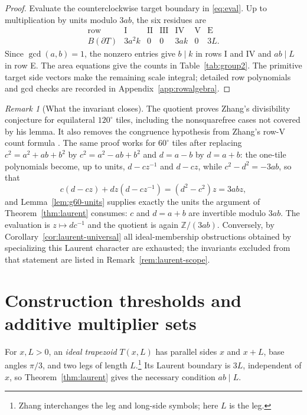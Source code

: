 \documentclass[11pt]{amsart}
\theoremstyle{definition}
\theoremstyle{remark}
\newtheorem{remark}[theorem]{Remark}
\newcommand{\Z}{\mathbb Z}
\begin{document}
\begin{proof}
Evaluate the counterclockwise target boundary in
\eqref{eq:eval}.  Up to multiplication by units modulo $3ab$, the six
residues are
\[
\begin{array}{c|cccccc}
\text{row}&\mathrm{I}&\mathrm{II}&\mathrm{III}&\mathrm{IV}&\mathrm{V}&\mathrm{E}\\
\hline
B(\partial T)&3a^2k&0&0&3ak&0&3L.
\end{array}
\]
Since $\gcd(a,b)=1$, the nonzero entries give $b\mid k$ in rows I and IV
and $ab\mid L$ in row E.  The area equations give the counts in
Table~\ref{tab:group2}.  The primitive target side vectors make the remaining
scale integral; detailed row polynomials and gcd checks are recorded in
Appendix~\ref{app:rowalgebra}.
\end{proof}

\begin{remark}[What the invariant closes]\label{rem:boundaryscope}
The quotient proves Zhang's divisibility conjecture for equilateral
$120^\circ$ tiles, including the nonsquarefree cases not covered by his
lemma.  It also removes the congruence hypothesis from Zhang's row-V count
formula \cite{Zhang25}.  The same proof works for $60^\circ$ tiles after
replacing $c^2=a^2+ab+b^2$ by $c^2=a^2-ab+b^2$ and $d=a-b$ by $d=a+b$: the
one-tile polynomials become, up to units, $d-cz^{-1}$ and $d-cz$, while
$c^2-d^2=-3ab$, so that
\[
 c(d-cz)+dz(d-cz^{-1})=(d^2-c^2)z=3abz,
\]
and Lemma~\ref{lem:g60-units} supplies exactly the units the argument of
Theorem~\ref{thm:laurent} consumes: $c$ and $d=a+b$ are invertible modulo
$3ab$.  The evaluation is $z\mapsto dc^{-1}$ and the quotient is again
$\Z/(3ab)$.  Conversely, by Corollary~\ref{cor:laurent-universal} all
ideal-membership obstructions obtained by specializing this Laurent character
are exhausted; the invariants excluded from that statement are listed in
Remark~\ref{rem:laurent-scope}.
\end{remark}

\section{Construction thresholds and additive multiplier sets}
\label{sec:semigroup}

For $x,L>0$, an \emph{ideal trapezoid} $T(x,L)$ has parallel sides $x$ and $x+L$, base
angles $\pi/3$, and two legs of length $L$.\footnote{Zhang
\cite{Zhang25} interchanges the leg and long-side symbols; here $L$ is the leg.}
Its Laurent boundary is $3L$,
independent of $x$, so Theorem~\ref{thm:laurent} gives the necessary condition
$ab\mid L$.
\end{document}
